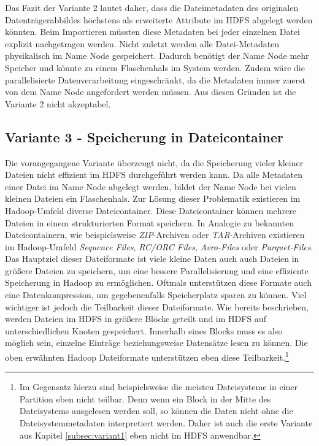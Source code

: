 \noindent
Das Fazit der Variante 2 lautet daher, dass die Dateimetadaten des originalen Datenträgerabbildes höchstens als erweiterte Attribute im HDFS abgelegt werden könnten. Beim Importieren müssten diese Metadaten bei jeder einzelnen Datei explizit nachgetragen werden. Nicht zuletzt werden alle Datei-Metadaten physikalisch im Name Node gespeichert. Dadurch benötigt der Name Node mehr Speicher und könnte zu einem Flaschenhals im System werden. Zudem wäre die parallelisierte Datenverarbeitung eingeschränkt, da die Metadaten immer zuerst von dem Name Node angefordert werden müssen. Aus diesen Gründen ist die Variante 2 nicht akzeptabel. 

\subsection{Variante 3 - Speicherung in Dateicontainer}

Die vorangegangene Variante überzeugt nicht, da die Speicherung vieler kleiner Dateien nicht effizient im HDFS durchgeführt werden kann. Da alle Metadaten einer Datei im Name Node abgelegt werden, bildet der Name Node bei vielen kleinen Dateien ein Flaschenhals. Zur Lösung dieser Problematik existieren im Hadoop-Umfeld diverse Dateicontainer. Diese Dateicontainer können mehrere Dateien in einem strukturierten Format speichern. In Analogie zu bekannten Dateicontainern, wie beispielsweise \textit{ZIP}-Archiven oder \textit{TAR}-Archiven existieren im Hadoop-Umfeld \textit{Sequence Files}, \textit{RC/ORC Files}, \textit{Avro-Files} oder \textit{Parquet-Files}.\cite[S. 296]{expert_hadoop_admin} \\
Das Hauptziel dieser Dateiformate ist viele kleine Daten auch auch Dateien in größere Dateien zu speichern, um eine bessere Parallelisierung und eine effiziente Speicherung in Hadoop zu ermöglichen. Oftmals unterstützen diese Formate auch eine Datenkompression, um gegebenenfalls Speicherplatz sparen zu können. Viel wichtiger ist jedoch die Teilbarkeit dieser Dateiformate. Wie bereits beschrieben, werden Dateien im HDFS in größere Blöcke geteilt und im HDFS auf unterschiedlichen Knoten gespeichert. Innerhalb eines Blocks muss es also möglich sein, einzelne Einträge beziehungsweise Datensätze lesen zu können. Die oben erwähnten Hadoop Dateiformate unterstützen eben diese Teilbarkeit.\footnote{Im Gegensatz hierzu sind beispielsweise die meisten Dateisysteme in einer Partition eben nicht teilbar. Denn wenn ein Block in der Mitte des Dateisystems ausgelesen werden soll, so können die Daten nicht ohne die Dateisystemmetadaten interpretiert werden. Daher ist auch die erste Variante aus Kapitel \ref{subsec:variant1} eben nicht im HDFS anwendbar.}\\

